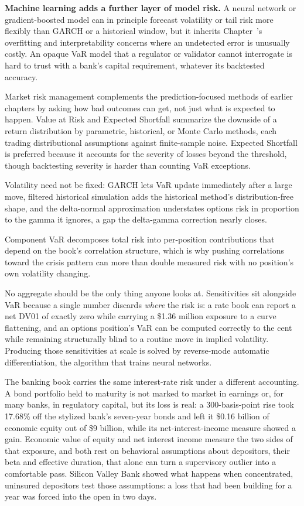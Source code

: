 \documentclass[../ai_in_finance]{subfiles}
\begin{document}
\textbf{Machine learning adds a further layer of model risk.} A neural network or gradient-boosted model can in principle forecast volatility or tail risk more flexibly than GARCH or a historical window, but it inherits Chapter~'s overfitting and interpretability concerns where an undetected error is unusually costly. An opaque VaR model that a regulator or validator cannot interrogate is hard to trust with a bank's capital requirement, whatever its backtested accuracy.


Market risk management complements the prediction-focused methods of earlier chapters by asking how bad outcomes can get, not just what is expected to happen. Value at Risk and Expected Shortfall summarize the downside of a return distribution by parametric, historical, or Monte Carlo methods, each trading distributional assumptions against finite-sample noise. Expected Shortfall is preferred because it accounts for the severity of losses beyond the threshold, though backtesting severity is harder than counting VaR exceptions.

Volatility need not be fixed: GARCH lets VaR update immediately after a large move, filtered historical simulation adds the historical method's distribution-free shape, and the delta-normal approximation understates options risk in proportion to the gamma it ignores, a gap the delta-gamma correction nearly closes.

Component VaR decomposes total risk into per-position contributions that depend on the book's correlation structure, which is why pushing correlations toward the crisis pattern can more than double measured risk with no position's own volatility changing.

No aggregate should be the only thing anyone looks at. Sensitivities sit alongside VaR because a single number discards \emph{where} the risk is: a rate book can report a net DV01 of exactly zero while carrying a \$1.36 million exposure to a curve flattening, and an options position's VaR can be computed correctly to the cent while remaining structurally blind to a routine move in implied volatility. Producing those sensitivities at scale is solved by reverse-mode automatic differentiation, the algorithm that trains neural networks.

The banking book carries the same interest-rate risk under a different accounting. A bond portfolio held to maturity is not marked to market in earnings or, for many banks, in regulatory capital, but its loss is real: a 300-basis-point rise took 17.68\% off the stylized bank's seven-year bonds and left it \$0.16 billion of economic equity out of \$9 billion, while its net-interest-income measure showed a gain. Economic value of equity and net interest income measure the two sides of that exposure, and both rest on behavioral assumptions about depositors, their beta and effective duration, that alone can turn a supervisory outlier into a comfortable pass. Silicon Valley Bank showed what happens when concentrated, uninsured depositors test those assumptions: a loss that had been building for a year was forced into the open in two days.
\end{document}
